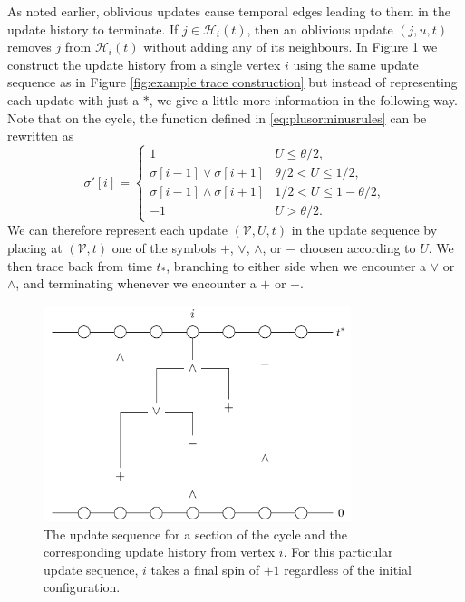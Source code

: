	As noted earlier, oblivious updates cause temporal edges leading to them in the update history to terminate. If $j \in \mathcal{H}_i(t)$, then an oblivious update $(j, u, t)$ removes $j$ from $\mathcal{H}_i(t)$ without adding any of its neighbours. In Figure \ref{fig:example percolation construction oblivious} we construct the update history from a single vertex $i$ using the same update sequence as in Figure \ref{fig:example trace construction} but instead of representing each update with just a $*$, we give a little more information in the following way. Note that on the cycle, the function defined in \eqref{eq:plusorminusrules} can be rewritten as
	\begin{equation}
		\sigma'[i] = 
		\begin{cases}
			1 & U \leq \theta/2,\\
			\sigma[i-1] \vee \sigma[i+1] & \theta/2 < U \leq 1/2,\\
			\sigma[i-1] \wedge \sigma[i+1] & 1/2 < U \leq 1 - \theta/2,\\
			-1	& U > \theta/2.
		\end{cases}
	\end{equation}
	We can therefore represent each update $(\mathcal{V}, U, t)$ in the update sequence by placing at $(\mathcal{V}, t)$ one of the symbols $+$, $\vee$, $\wedge$, or $-$ choosen according to $U$. We then trace back from time $t_*$, branching to either side when we encounter a $\vee$ or $\wedge$, and terminating whenever we encounter a $+$ or $-$.

	\begin{figure}
		\centering
		\includegraphics[width = 0.8\textwidth]{Figures/IsingCouplingTime/example_percolation_construction_oblivious.pdf}
		\caption[The update sequence for a section of the cycle and the corresponding update history from vertex i]{The update sequence for a section of the cycle and the corresponding update history from vertex $i$. For this particular update sequence, $i$ takes a final spin of $+1$ regardless of the initial configuration.}
		\label{fig:example percolation construction oblivious}
	\end{figure}

